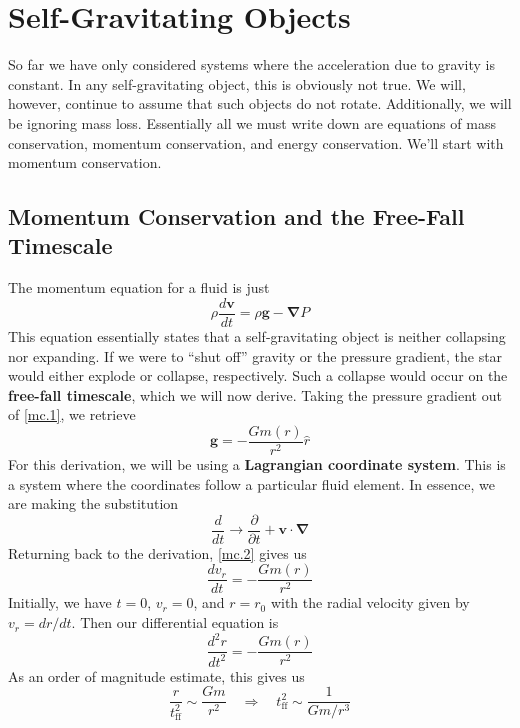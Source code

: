 \documentclass[10pt]{article}
\numberwithin{equation}{section}
\begin{document}
\section{Self-Gravitating Objects}
	So far we have only considered systems where the acceleration due to gravity is constant. In any self-gravitating object, this is obviously not true. We will, however, continue to assume that such objects do not rotate. Additionally, we will be ignoring mass loss. Essentially all we must write down are equations of mass conservation, momentum conservation, and energy conservation. We'll start with momentum conservation.
	\subsection{Momentum Conservation and the Free-Fall Timescale}
	The momentum equation for a fluid is just
	\begin{equation}
		\label{mc.1} \rho\frac{d\mathbf{v}}{dt}=\rho\mathbf{g}-\bm{\nabla}P
	\end{equation}
	This equation essentially states that a self-gravitating object is neither collapsing nor expanding. If we were to ``shut off'' gravity or the pressure gradient, the star would either explode or collapse, respectively. Such a collapse would occur on the \textbf{free-fall timescale}, which we will now derive. Taking the pressure gradient out of \eqref{mc.1}, we retrieve
	\begin{equation}
		\label{mc.2} \mathbf{g}=-\frac{Gm(r)}{r^2}\hat{r}
	\end{equation}
	For this derivation, we will be using a \textbf{Lagrangian coordinate system}. This is a system where the coordinates follow a particular fluid element. In essence, we are making the substitution
	\begin{equation}
		\label{mc.3} \frac{d}{dt}\to\frac{\partial}{\partial t}+\mathbf{v}\cdot\bm{\nabla}
	\end{equation}
	Returning back to the derivation, \eqref{mc.2} gives us
	\begin{equation}
		\label{mc.4} \frac{dv_r}{dt}=-\frac{Gm(r)}{r^2}
	\end{equation}
	Initially, we have $t=0$, $v_r=0$, and $r=r_0$ with the radial velocity given by $v_r=dr/dt$. Then our differential equation is
	\begin{equation}
		\label{mc.5} \frac{d^2r}{dt^2}=-\frac{Gm(r)}{r^2}
	\end{equation}
	As an order of magnitude estimate, this gives us
	\begin{equation}
		\label{mc.6}\frac{r}{t_{\mathrm{ff}}^2}\sim\frac{Gm}{r^2}\quad \Rightarrow \quad t_{\mathrm{ff}}^2\sim\frac{1}{Gm/r^3}
	\end{equation}
\end{document}
